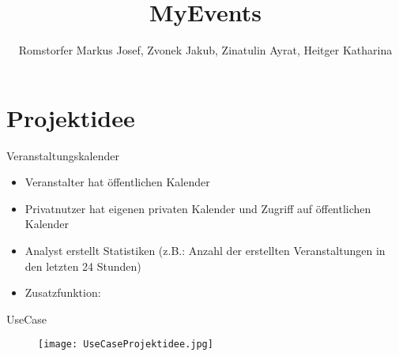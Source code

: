 \documentclass{beamer}
\title{MyEvents}
\author{Romstorfer Markus Josef, Zvonek Jakub, Zinatulin Ayrat, Heitger Katharina}
\begin{document}
\frame{\titlepage}

\section{Projektidee}
\begin{frame}{Veranstaltungskalender}
\begin{itemize}
\item Veranstalter hat öffentlichen Kalender
\item Privatnutzer hat eigenen privaten Kalender und Zugriff auf öffentlichen Kalender
\item Analyst erstellt Statistiken (z.B.: Anzahl der erstellten Veranstaltungen in den letzten 24 Stunden)
\item Zusatzfunktion:
\end{itemize}
\end{frame}

\begin{frame}{UseCase}
\begin{figure}
\texttt{[image: UseCaseProjektidee.jpg]}
\end{figure}

\end{frame}
\end{document}
